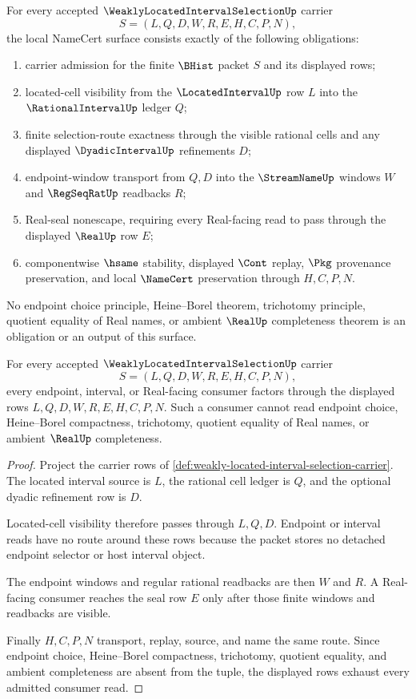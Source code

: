\begin{theorem}
\label{thm:weakly-located-interval-selection-namecert-obligations}
For every accepted $\WeaklyLocatedIntervalSelectionUp$ carrier
$$
S=(L,Q,D,W,R,E,H,C,P,N),
$$
the local NameCert surface consists exactly of the following obligations:
\begin{enumerate}
\item carrier admission for the finite $\BHist$ packet $S$ and its displayed rows;
\item located-cell visibility from the $\LocatedIntervalUp$ row $L$ into the $\RationalIntervalUp$ ledger $Q$;
\item finite selection-route exactness through the visible rational cells and any displayed $\DyadicIntervalUp$ refinements $D$;
\item endpoint-window transport from $Q,D$ into the $\StreamNameUp$ windows $W$ and $\RegSeqRatUp$ readbacks $R$;
\item Real-seal nonescape, requiring every Real-facing read to pass through the displayed $\RealUp$ row $E$;
\item componentwise $\hsame$ stability, displayed $\Cont$ replay, $\Pkg$ provenance preservation, and local $\NameCert$ preservation through $H,C,P,N$.
\end{enumerate}
No endpoint choice principle, Heine--Borel theorem, trichotomy principle, quotient equality of Real names, or ambient $\RealUp$ completeness theorem is an obligation or an output of this surface.
\end{theorem}

\begin{theorem}
\label{thm:weakly-located-interval-selection-route-exhaustion}
For every accepted $\WeaklyLocatedIntervalSelectionUp$ carrier
$$
S=(L,Q,D,W,R,E,H,C,P,N),
$$
every endpoint, interval, or Real-facing consumer factors through the displayed rows $L,Q,D,W,R,E,H,C,P,N$. Such a consumer cannot read endpoint choice, Heine--Borel compactness, trichotomy, quotient equality of Real names, or ambient $\RealUp$ completeness.
\end{theorem}
\begin{proof}
Project the carrier rows of \autoref{def:weakly-located-interval-selection-carrier}. The located interval source is $L$, the rational cell ledger is $Q$, and the optional dyadic refinement row is $D$.

Located-cell visibility therefore passes through $L,Q,D$. Endpoint or interval reads have no route around these rows because the packet stores no detached endpoint selector or host interval object.

The endpoint windows and regular rational readbacks are then $W$ and $R$. A Real-facing consumer reaches the seal row $E$ only after those finite windows and readbacks are visible.

Finally $H,C,P,N$ transport, replay, source, and name the same route. Since endpoint choice, Heine--Borel compactness, trichotomy, quotient equality, and ambient completeness are absent from the tuple, the displayed rows exhaust every admitted consumer read.
\end{proof}

